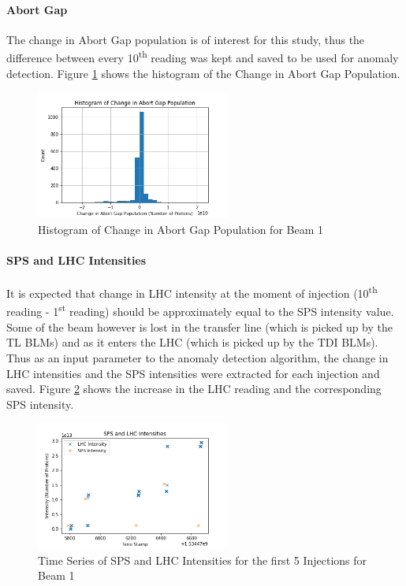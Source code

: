 \documentclass[conference, a4paper]{IEEEtran}
\begin{document}
	
	
	\paragraph{Abort Gap}The change in Abort Gap population is of interest for this study, thus the difference between every 10\textsuperscript{th} reading was kept and saved to be used for anomaly detection. Figure \ref{fig::Change_in_Abort_Gap_hist} shows the histogram of the Change in Abort Gap Population.
	
	\begin{figure}[!t]
		\centering
		\includegraphics[width=2.5in]{Histogram_of_Change_in_Abort_Gap_Population}
		\caption[Change in Abort Gap Histogram]{Histogram of Change in Abort Gap Population for Beam 1}
		\label{fig::Change_in_Abort_Gap_hist}
	\end{figure}

	\paragraph{SPS and LHC Intensities}It is expected that change in LHC intensity at the moment of injection (10\textsuperscript{th} reading - 1\textsuperscript{st} reading) should be approximately equal to the SPS intensity value. Some of the beam however is lost in the transfer line (which is picked up by the TL BLMs) and as it enters the LHC (which is picked up by the TDI BLMs). Thus as an input parameter to the anomaly detection algorithm, the change in LHC intensities and the SPS intensities were extracted for each injection and saved. Figure \ref{fig::SPS_and_LHC} shows the increase in the LHC reading and the corresponding SPS intensity.

	\begin{figure}[!b]
		\centering
		\includegraphics[width=2.5in]{SPS_and_LHC_Intensities}
		\caption[SPS and LHC Intensities]{Time Series of SPS and LHC Intensities for the first 5 Injections for Beam 1}
		\label{fig::SPS_and_LHC}
	\end{figure} 
\end{document}
